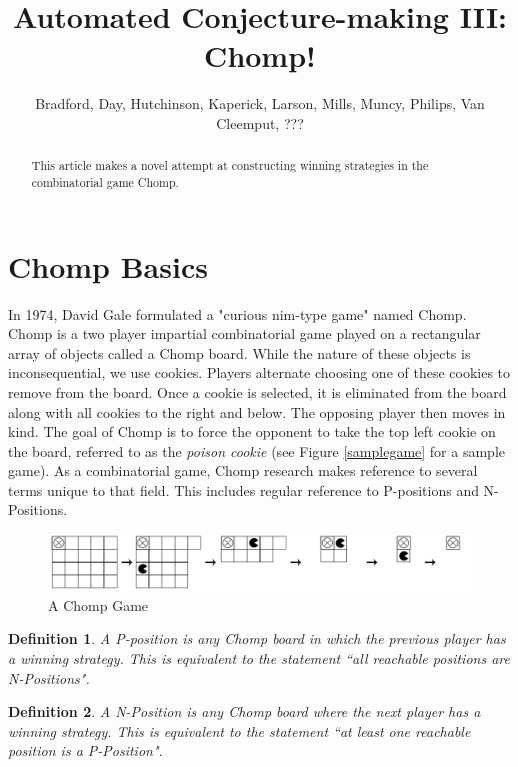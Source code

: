 \documentclass{amsart}
\title{Automated Conjecture-making III: Chomp!}
\author{Bradford, Day, Hutchinson, Kaperick, Larson, Mills, Muncy, Philips, Van Cleemput, ???}
\newtheorem{term}{Definition} %
\theoremstyle{definition}
\theoremstyle{remark}
\numberwithin{equation}{section}
\begin{document}
\begin{abstract}
This article makes a novel attempt at constructing winning strategies in the combinatorial game Chomp. 
\end{abstract}
\maketitle


\section{Chomp Basics}
\label{introduction}
\noindent In 1974, David Gale formulated a "curious nim-type game" named Chomp\cite{Gale74}. Chomp is a two player impartial combinatorial game played on a rectangular array of objects called a Chomp board. While the nature of these objects is inconsequential, we use cookies. Players alternate choosing one of these cookies to remove from the board.  Once a cookie is selected, it is eliminated from the board along with all cookies to the right and below. The opposing player then moves in kind.  The goal of Chomp is to force the opponent to take the top left cookie on the board, referred to as the \textit{poison cookie} (see Figure \ref{samplegame} for a sample game). As a combinatorial game, Chomp research makes reference to several terms unique to that field. This includes regular reference to P-positions and N-Positions\cite{winningways}.\\

\begin{figure}[samplegame]
\includegraphics[scale=0.27]{Images/sample_game_draft_v2.png}
\caption{A Chomp Game}
\end{figure}

\begin{term}
\label{ppos}
 A \textit{P-position} is any Chomp board in which the previous player has a winning strategy.  This is equivalent to the statement ``all reachable positions are N-Positions".
\end{term}

\begin{term}
\label{npos}
A \textit{N-Position} is any Chomp board where the next player has a winning strategy.  This is equivalent to the statement ``at least one reachable position is a P-Position".\\
\end{term}
\end{document}
